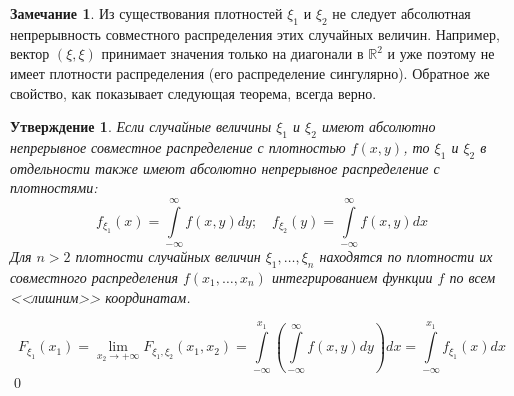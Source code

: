 \documentclass[oneside,final,14pt]{extreport}
\renewenvironment{proof}{{\bfseries Доказательство.}}{\qed}
\theoremstyle{plain}
\newtheorem*{thm*}{Утверждение}
\theoremstyle{definition}
\newtheorem*{rmrk}{Замечание}
\theoremstyle{named}
\begin{document}
\begin{rmrk}
    Из существования плотностей $\xi_1$ и $\xi_2$ не следует абсолютная непрерывность совместного распределения этих случайных величин. Например, вектор $(\xi, \xi)$ принимает значения только на диагонали в $\mathbb{R}^2$ и уже поэтому не имеет плотности распределения (его распределение сингулярно). Обратное же свойство, как показывает следующая теорема, всегда верно.
\end{rmrk}

\begin{thm*}
    Если случайные величины $\xi_1$ и $\xi_2$ имеют абсолютно непрерывное совместное распределение с плотностью $f(x, y)$, то $\xi_1$ и $\xi_2$ в отдельности также имеют абсолютно непрерывное распределение с плотностями:
    \begin{equation*}
        f_{\xi_{1}}(x)=\int\limits_{-\infty}^{\infty} f(x, y) d y ; \quad f_{\xi_{2}}(y)=\int\limits_{-\infty}^{\infty} f(x, y) d x
    \end{equation*}
    Для $n > 2$ плотности случайных величин $\xi_1, \ldots, \xi_n$ находятся по плотности их совместного распределения $f(x_1, \ldots, x_n)$ интегрированием функции $f$ по всем <<лишним>> координатам.
\end{thm*}
\begin{proof}
\begin{equation*}
    F_{\xi_{1}}\left(x_{1}\right)
    = \lim _{x_{2} \rightarrow+\infty} F_{\xi_{1}, \xi_{2}}\left(x_{1}, x_{2}\right)
    = \int\limits_{-\infty}^{x_{1}}\left(\int\limits_{-\infty}^{\infty} f(x, y) d y\right) d x
    = \int\limits_{-\infty}^{x_{1}} f_{\xi_{1}}(x) d x
\end{equation*}
\end{proof}
\end{document}
